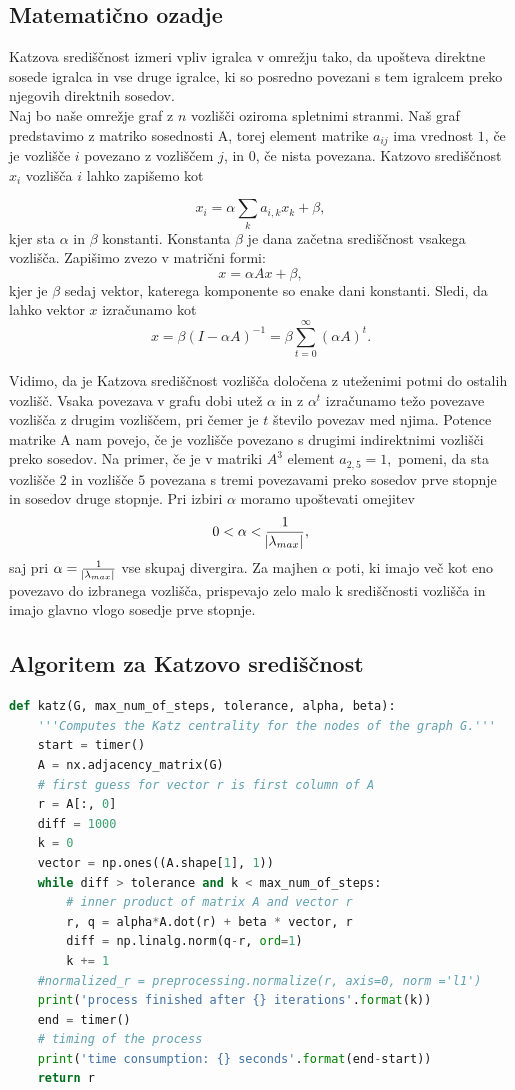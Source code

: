 \documentclass[a4paper]{article}
\begin{document}
\subsection{Matematično ozadje}


\hspace{4.8mm}Katzova središčnost izmeri vpliv igralca v omrežju tako, da upošteva direktne sosede igralca in vse druge igralce, ki so posredno povezani s tem igralcem preko njegovih direktnih sosedov. \\
Naj bo naše omrežje graf z $n$ vozlišči oziroma spletnimi stranmi. Naš graf predstavimo z matriko sosednosti A, torej element matrike $a_{ij}$ ima vrednost $1$, če je vozlišče $i$ povezano z vozliščem $j$, in $0$, če nista povezana. Katzovo središčnost $x_{i}$ vozlišča $i$ lahko zapišemo kot

$$x_{i} = \alpha\sum_{k}a_{i,k}x_{k} + \beta,$$
kjer sta $\alpha$ in $\beta$ konstanti. Konstanta $\beta$ je dana začetna središčnost vsakega vozlišča. Zapišimo zvezo v matrični formi:
$$x = \alpha Ax + \beta,$$
kjer je $\beta$ sedaj vektor, katerega komponente so enake dani konstanti. Sledi, da lahko vektor $x$ izračunamo kot
$$x = \beta (I - \alpha A)^{-1} = \beta \sum_{t=0}^{\infty} (\alpha A)^t. $$

Vidimo, da je Katzova središčnost vozlišča določena z uteženimi potmi do ostalih vozlišč. Vsaka povezava v grafu dobi utež $\alpha$ in z $\alpha^{t}$ izračunamo težo povezave vozlišča z drugim vozliščem, pri čemer je $t$ število povezav med njima. Potence matrike A nam povejo, če je vozlišče povezano s drugimi indirektnimi vozlišči preko sosedov. Na primer, če je v matriki $A^{3}$ element $a_{2,5}  = 1,$ pomeni, da sta vozlišče $2$ in vozlišče $5$ povezana s tremi povezavami preko sosedov prve stopnje in sosedov druge stopnje.
Pri izbiri $\alpha$ moramo upoštevati omejitev 
$$0 < \alpha < \frac{1}{\abs{\lambda_{max}}},$$
saj pri $\alpha = \frac{1}{\abs{\lambda_{max}}}$ vse skupaj divergira. Za majhen $\alpha$ poti, ki imajo več kot eno povezavo do izbranega vozlišča, prispevajo zelo malo k središčnosti vozlišča in imajo glavno vlogo sosedje prve stopnje.


\subsection{Algoritem za Katzovo središčnost}
\begin{lstlisting}[language=Python]
def katz(G, max_num_of_steps, tolerance, alpha, beta):
    '''Computes the Katz centrality for the nodes of the graph G.'''
    start = timer()
    A = nx.adjacency_matrix(G)
    # first guess for vector r is first column of A
    r = A[:, 0]  
    diff = 1000
    k = 0
    vector = np.ones((A.shape[1], 1))
    while diff > tolerance and k < max_num_of_steps:
        # inner product of matrix A and vector r
        r, q = alpha*A.dot(r) + beta * vector, r
        diff = np.linalg.norm(q-r, ord=1)
        k += 1
    #normalized_r = preprocessing.normalize(r, axis=0, norm ='l1')
    print('process finished after {} iterations'.format(k))
    end = timer()
    # timing of the process
    print('time consumption: {} seconds'.format(end-start))
    return r
\end{lstlisting}
\end{document}
